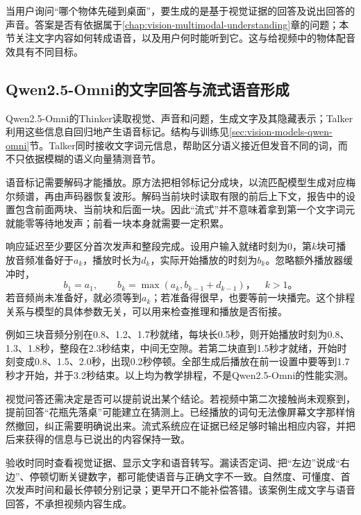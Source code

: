 当用户询问“哪个物体先碰到桌面”，要生成的是基于视觉证据的回答及说出回答的声音。答案是否有依据属于\ref{chap:vision-multimodal-understanding}章的问题；本节关注文字内容如何转成语音，以及用户何时能听到它。这与给视频中的物体配音效具有不同目标。

\subsection{Qwen2.5-Omni的文字回答与流式语音形成}
\label{sec:vision-multigen-omni-response}

Qwen2.5-Omni的Thinker读取视觉、声音和问题，生成文字及其隐藏表示；Talker利用这些信息自回归地产生语音标记。结构与训练见\ref{sec:vision-models-qwen-omni}节。Talker同时接收文字词元信息，帮助区分语义接近但发音不同的词，而不只依据模糊的语义向量猜测音节。

语音标记需要解码才能播放。原方法把相邻标记分成块，以流匹配模型生成对应梅尔频谱，再由声码器恢复波形。解码当前块时读取有限的前后上下文，报告中的设置包含前面两块、当前块和后面一块。因此“流式”并不意味着拿到第一个文字词元就能零等待地发声；前看一块本身就需要一定积累。

响应延迟至少要区分首次发声和整段完成。设用户输入就绪时刻为0，第$k$块可播放音频准备好于$a_k$，播放时长为$d_k$，实际开始播放的时刻为$b_k$。忽略额外播放器缓冲时，
\begin{equation}
  b_1=a_1,\qquad
  b_k=\max(a_k,b_{k-1}+d_{k-1})\text{，}\quad k>1\text{。}
  \label{eq:vision-stream-playback}
\end{equation}
若音频尚未准备好，就必须等到$a_k$；若准备得很早，也要等前一块播完。这个排程关系与模型的具体参数无关，可以用来检查推理和播放是否衔接。

例如三块音频分别在0.8、1.2、1.7秒就绪，每块长0.5秒，则开始播放时刻为0.8、1.3、1.8秒，整段在2.3秒结束，中间无空隙。若第二块直到1.5秒才就绪，开始时刻变成0.8、1.5、2.0秒，出现0.2秒停顿。全部生成后播放在前一设置中要等到1.7秒才开始，并于3.2秒结束。以上均为教学排程，不是Qwen2.5-Omni的性能实测。

视觉问答还需决定是否可以提前说出某个结论。若视频中第二次接触尚未观察到，提前回答“花瓶先落桌”可能建立在猜测上。已经播放的词句无法像屏幕文字那样悄然撤回，纠正需要明确说出来。流式系统应在证据已经足够时输出相应内容，并把后来获得的信息与已说出的内容保持一致。

验收时同时查看视觉证据、显示文字和语音转写。漏读否定词、把“左边”说成“右边”、停顿切断关键数字，都可能使语音与正确文字不一致。自然度、可懂度、首次发声时间和最长停顿分别记录；更早开口不能补偿答错。该案例生成文字与语音回答，不承担视频内容生成。

